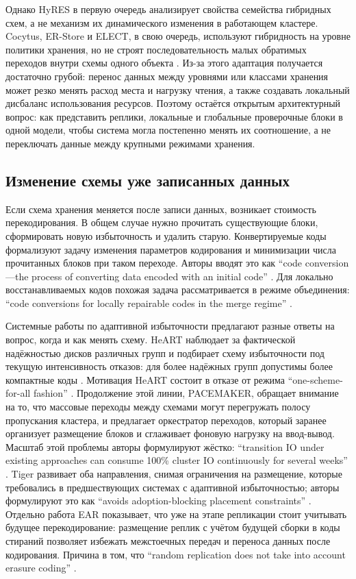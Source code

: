 Однако HyRES в первую очередь анализирует свойства семейства гибридных схем, а
не механизм их динамического изменения в работающем кластере. Cocytus, ER-Store
и ELECT, в свою очередь, используют гибридность на уровне политики хранения,
но не строят последовательность малых обратимых переходов внутри схемы одного
объекта \cite{zhang2016cocytus,li2021erstore,ren2024elect}. Из-за этого
адаптация получается
достаточно грубой: перенос данных между уровнями или классами хранения может
резко менять расход места и нагрузку чтения, а также создавать локальный
дисбаланс использования ресурсов. Поэтому остаётся открытым архитектурный
вопрос: как представить реплики, локальные и глобальные проверочные блоки
в одной модели, чтобы система могла постепенно менять их соотношение, а не
переключать данные между крупными режимами хранения.

\subsection*{Изменение схемы уже записанных данных}

Если схема хранения меняется после записи данных, возникает стоимость
перекодирования. В общем случае нужно прочитать существующие блоки,
сформировать новую избыточность и удалить старую. Конвертируемые коды
формализуют задачу изменения параметров кодирования и минимизации числа
прочитанных блоков при таком переходе. Авторы вводят это как
\enquote{code conversion---the process of converting data encoded with an
initial code} \cite{maturana2022convertible}.
Для локально восстанавливаемых кодов похожая задача рассматривается в режиме
объединения: \enquote{code conversions for locally repairable codes in the
merge regime} \cite{kong2024lrcconvertible}.

Системные работы по адаптивной избыточности предлагают разные ответы на
вопрос, когда и как менять схему. HeART наблюдает за фактической надёжностью
дисков различных групп и подбирает схему избыточности под текущую интенсивность
отказов: для более надёжных групп допустимы более компактные коды
\cite{kadekodi2019heart}. Мотивация HeART состоит в отказе от режима
\enquote{one-scheme-for-all fashion} \cite{kadekodi2019heart}. Продолжение этой линии, PACEMAKER, обращает
внимание на то, что массовые переходы между схемами могут перегружать
полосу пропускания кластера, и предлагает оркестратор переходов, который
заранее организует размещение блоков и сглаживает фоновую нагрузку на
ввод-вывод. Масштаб этой проблемы авторы формулируют жёстко:
\enquote{transition IO under existing approaches can consume 100\% cluster IO
continuously for several weeks} \cite{kadekodi2020pacemaker}. Tiger развивает оба направления,
снимая ограничения на размещение, которые требовались в предшествующих
системах с адаптивной избыточностью; авторы формулируют это как
\enquote{avoids adoption-blocking placement constraints} \cite{kadekodi2022tiger}. Отдельно
работа EAR показывает, что уже на этапе репликации стоит учитывать будущее
перекодирование: размещение реплик с учётом будущей сборки в коды стираний
позволяет избежать межстоечных передач и переноса данных после
кодирования. Причина в том, что \enquote{random replication does not take into
account erasure coding} \cite{li2017ear}.


